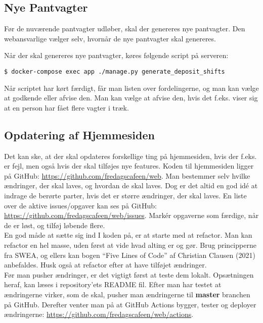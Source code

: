 \subsection{Nye Pantvagter}
\label{sec:nye-pantvagter}

Før de nuværende pantvagter udløber, skal der genereres nye pantvagter.
Den webansvarlige vælger selv, hvornår de nye pantvagter skal genereres.

Når der skal genereres nye pantvagter, køres følgende script på serveren:

\begin{verbatim}
$ docker-compose exec app ./manage.py generate_deposit_shifts
\end{verbatim}

Når scriptet har kørt færdigt, får man listen over fordelingerne, og man kan vælge at godkende eller
afvise den. Man kan vælge at afvise den, hvis det f.eks. viser sig at en person har fået flere vagter 
i træk.

\subsection{Opdatering af Hjemmesiden}
\label{sec:opdatering-af-hjemmesiden}

Det kan ske, at der skal opdateres forskellige ting på hjemmesiden, hvis der f.eks. er fejl, men også
hvis der skal tilføjes nye features.
Koden til hjemmesiden ligger på GitHub: \url{https://github.com/fredagscafeen/web}.
Man bestemmer selv hvilke ændringer, der skal laves, og hvordan de skal laves. Dog er det altid en god
idé at indrage de berørte parter, hvis det er større ændringer, der skal laves. En liste over de
aktive issues/opgaver kan ses på GitHub: \url{https://github.com/fredagscafeen/web/issues}. Markér
opgaverne som færdige, når de er løst, og tilføj løbende flere.\\

En god måde at sætte sig ind I koden på, er at starte med at refactor. Man kan refactor en hel masse, 
uden først at vide hvad alting er og gør. Brug principperne fra SWEA, og ellers kan bogen 
``Five Lines of Code'' af Christian Clausen (2021) anbefaldes. Husk også at refactor efter at 
have tilføjet ændringer. \\

Før man pusher ændringer, er det vigtigt først at teste dem lokalt. Opsætningen heraf, 
kan læses i repository'ets README fil.
Efter man har testet at ændringerne virker, som de skal, pusher man ændringerne til \textbf{master}
branchen på GitHub. Derefter venter man på at GitHub Actions bygger, tester og deployer ændringerne:
\url{https://github.com/fredagscafeen/web/actions}.

